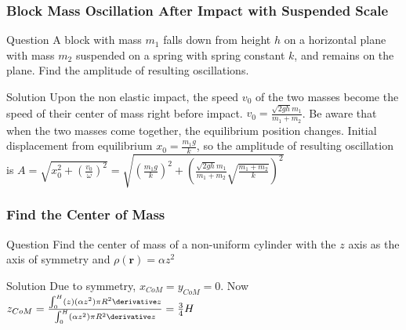 \begin{frame}
\frametitle{Block Mass Oscillation After Impact with Suspended Scale}
\begin{block}{Question}
A block with mass $m_1$ falls down from height $h$ on a horizontal plane with mass $m_2$ suspended on a spring with spring constant $k$, and \alert{remains} on the plane. Find the \alert{amplitude} of resulting oscillations.
\end{block}
\begin{block}{Solution}
Upon the \alert{non elastic} impact, the speed $v_0$ of the two masses become the speed of their center of mass right before impact. $v_0=\frac{\sqrt{2gh}m_1}{m_1+m_2}$. Be aware that when the two masses come together, the \alert{equilibrium} position changes. Initial displacement from equilibrium $x_0=\frac{m_1 g}{k}$, so the \alert{amplitude} of resulting oscillation is
$A=\sqrt{x_0^2+\left(\frac{v_0}{\omega}\right)^2}=\sqrt{\left(\frac{m_1 g}{k}\right)^2+\left(\frac{\sqrt{2gh}m_1}{m_1+m_2}\sqrt{\frac{m_1+m_2}{k}}\right)^2}$
\end{block}
\end{frame}
\begin{frame}\label{RC6slide:excenterofomass}
\frametitle{Find the Center of Mass}
\begin{block}{Question}
Find the center of mass of a non-uniform cylinder with the $z$ axis as the axis of symmetry and $\rho (\mathbf{r})=\alpha z^2$
\end{block}
\begin{block}{Solution}
Due to symmetry, $x_{CoM}=y_{CoM}=0$. Now $z_{CoM}=\frac{\int_0^H (z) (\alpha z^2) \pi R^2 \derivative z}{\int_0^H(\alpha z^2) \pi R^2 \derivative z}=\frac{3}{4}H$
\end{block}
\end{frame}
